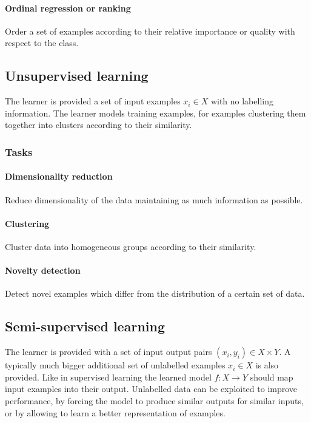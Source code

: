 			\paragraph{Ordinal regression or ranking}
			Order a set of examples according to their relative importance or quality with respect to the class.


	\subsection{Unsupervised learning}
	The learner is provided a set of input examples $x_i\in X$ with no labelling information.
	The learner models training examples, for examples clustering them together into clusters according to their similarity.

		\subsubsection{Tasks}

			\paragraph{Dimensionality reduction}
			Reduce dimensionality of the data maintaining as much information as possible.

			\paragraph{Clustering}
			Cluster data into homogeneous groups according to their similarity.

			\paragraph{Novelty detection}
			Detect novel examples which differ from the distribution of a certain set of data.


	\subsection{Semi-supervised learning}
	The learner is provided with a set of input output pairs $(x_i, y_i)\in X\times Y$.
	A typically much bigger additional set of unlabelled examples $x_i\in X$ is also provided.
	Like in supervised learning the learned model $f:X\rightarrow Y$ should map input examples into their output.
	Unlabelled data can be exploited to improve performance, by forcing the model to produce similar outputs for similar inputs, or by allowing to learn a better representation of examples.

